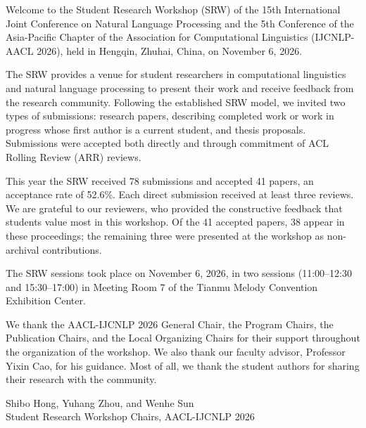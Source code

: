 Welcome to the Student Research Workshop (SRW) of the 15th International Joint Conference on Natural Language Processing and the 5th Conference of the Asia-Pacific Chapter of the Association for Computational Linguistics (IJCNLP-AACL 2026), held in Hengqin, Zhuhai, China, on November 6, 2026.

The SRW provides a venue for student researchers in computational linguistics and natural language processing to present their work and receive feedback from the research community. Following the established SRW model, we invited two types of submissions: research papers, describing completed work or work in progress whose first author is a current student, and thesis proposals. Submissions were accepted both directly and through commitment of ACL Rolling Review (ARR) reviews.

This year the SRW received 78 submissions and accepted 41 papers, an acceptance rate of 52.6\%. Each direct submission received at least three reviews. We are grateful to our reviewers, who provided the constructive feedback that students value most in this workshop. Of the 41 accepted papers, 38 appear in these proceedings; the remaining three were presented at the workshop as non-archival contributions.

The SRW sessions took place on November 6, 2026, in two sessions (11:00--12:30 and 15:30--17:00) in Meeting Room 7 of the Tianmu Melody Convention Exhibition Center.

We thank the AACL-IJCNLP 2026 General Chair, the Program Chairs, the Publication Chairs, and the Local Organizing Chairs for their support throughout the organization of the workshop. We also thank our faculty advisor, Professor Yixin Cao, for his guidance. Most of all, we thank the student authors for sharing their research with the community.

\vspace{1em}
\noindent Shibo Hong, Yuhang Zhou, and Wenhe Sun\\
Student Research Workshop Chairs, AACL-IJCNLP 2026
